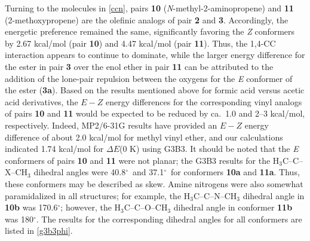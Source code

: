 \documentclass[12pt]{report}
\def\deg{$^{\circ}$}
\begin{document}
Turning to the molecules in \cref{ccn}, pairs \textbf{10} (\textit{N}-methyl-2-aminopropene) and \textbf{11} (2-methoxypropene) are the olefinic analogs of pair \textbf{2} and \textbf{3}. Accordingly, the energetic preference remained the same, significantly favoring the \textit{Z} conformers by 2.67 kcal/mol (pair \textbf{10}) and 4.47 kcal/mol (pair \textbf{11}). Thus, the 1,4-CC interaction appears to continue to dominate, while the larger energy difference for the ester in pair \textbf{3} over the enol ether in pair \textbf{11} can be attributed to the addition of the lone-pair repulsion between the oxygens for the \textit{E} conformer of the ester (\textbf{3a}). Based on the results mentioned above for formic acid versus acetic acid derivatives, the $E-Z$ energy differences for the corresponding vinyl analogs of pairs \textbf{10} and \textbf{11} would be expected to be reduced by ca.\ 1.0 and 2--3 kcal/mol, respectively. Indeed, MP2/6-31G results have provided an $E-Z$ energy difference of about 2.0 kcal/mol for methyl vinyl ether,\cite{nobes} and our calculations indicated 1.74 kcal/mol for $\Delta E$(0 K) using G3B3. It should be noted that the \textit{E} conformers of pairs \textbf{10} and \textbf{11} were not planar; the G3B3 results for the H$_3$C--C--X--CH$_3$ dihedral angles were 40.8\deg\ and 37.1\deg\ for conformers \textbf{10a} and \textbf{11a}. Thus, these conformers may be described as skew. Amine nitrogens were also somewhat paramidalized in all structures; for example, the H$_3$C--C--N--CH$_3$ dihedral angle in \textbf{10b} was 170.6\deg{}; however, the H$_3$C--C--O--CH$_3$ dihedral angle in conformer \textbf{11b} was 180\deg. The results for the corresponding dihedral angles for all conformers are listed in \cref{g3b3phi}.
\end{document}
